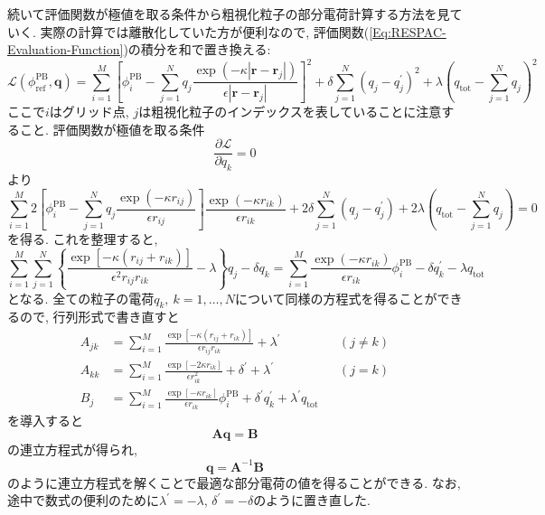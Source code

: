 続いて評価関数が極値を取る条件から粗視化粒子の部分電荷計算する方法を見ていく.
実際の計算では離散化していた方が便利なので, 評価関数(\ref{Eq:RESPAC-Evaluation-Function})の積分を和で置き換える:
\begin{equation}
    \mathcal{L} (\phi_{\mathrm{ref}}^{\mathrm{PB}}, \bm{q})
    =
    \sum_{i=1}^{M}
    \left[
        \phi_{i}^{\mathrm{PB}}
        -
        \sum_{j=1}^{N}
        q_{j}
        \frac{\exp(-\kappa |\bm{r} - \bm{r}_{j}|)}{\epsilon |\bm{r} - \bm{r}_{j}|}
    \right]^{2}
    +
    \delta \sum_{j=1}^{N} (q_{j} - q_{j}^{\prime})^{2}
    +
    \lambda(q_{\mathrm{tot}} - \sum_{j=1}^{N} q_{j})^{2}
    \label{Eq:RESPAC-Evaluation-Function-Discrete}
\end{equation}
ここで$i$はグリッド点, $j$は粗視化粒子のインデックスを表していることに注意すること.
評価関数が極値を取る条件
\begin{equation}
    \frac{\partial \mathcal{L}}{\partial q_{k}} = 0
\end{equation}
より
\begin{equation}
    \sum_{i=1}^{M}
    2
    \left[
        \phi_{i}^{\mathrm{PB}}
        -
        \sum_{j=1}^{N}
        q_{j}
        \frac{\exp(-\kappa r_{ij})}{\epsilon r_{ij}}
    \right]
    \frac{\exp(-\kappa r_{ik})}{\epsilon r_{ik}}
    +
    2 \delta \sum_{j=1}^{N} (q_{j} - q_{j}^{\prime})
    +
    2 \lambda(q_{\mathrm{tot}} - \sum_{j=1}^{N} q_{j})
    =
    0
\end{equation}
を得る. これを整理すると,
\begin{equation}
    \sum_{i=1}^{M} \sum_{j=1}^{N}
    \left\{
        \frac{\exp[-\kappa (r_{ij} + r_{ik})]}{\epsilon^{2} r_{ij}r_{ik}}
        -
        \lambda
    \right\} q_{j}
    -
    \delta q_{k}
    =
    \sum_{i=1}^{M}
    \frac{\exp(-\kappa r_{ik})}{\epsilon r_{ik}} \phi_{i}^{\mathrm{PB}}
    -
    \delta q_{k}^{\prime}
    -
    \lambda q_{\mathrm{tot}}
\end{equation}
となる. 全ての粒子の電荷$q_{k},~k = 1,\ldots,N$について同様の方程式を得ることができるので, 行列形式で書き直すと
\begin{align}
    A_{jk}
    &=
    \sum_{i=1}^{M}
    \frac{\exp[-\kappa(r_{ij} + r_{ik})]}{\epsilon r_{ij}r_{ik}}
    + \lambda^{\prime}
    &&(j\neq k)
    \\
    A_{kk}
    &=
    \sum_{i=1}^{M}
    \frac{\exp[-2\kappa r_{ik}]}{\epsilon r_{ik}^{2}}
    + \delta^{\prime}
    + \lambda^{\prime}
    &&(j = k)
    \\
    B_{j}
    &=
    \sum_{i=1}^{M}
    \frac{\exp[-\kappa r_{ik}]}{\epsilon r_{ik}} \phi_{i}^{\mathrm{PB}}
    +
    \delta^{\prime} q_{k}^{\prime}
    +
    \lambda^{\prime} q_{\mathrm{tot}}
\end{align}
を導入すると
\begin{equation}
    \bm{A} \bm{q} = \bm{B}
\end{equation}
の連立方程式が得られ,
\begin{equation}
    \bm{q} = \bm{A}^{-1}\bm{B}
\end{equation}
のように連立方程式を解くことで最適な部分電荷の値を得ることができる.
なお, 途中で数式の便利のために$\lambda^{\prime} = -\lambda$, $\delta^{\prime} = -\delta$のように置き直した.

